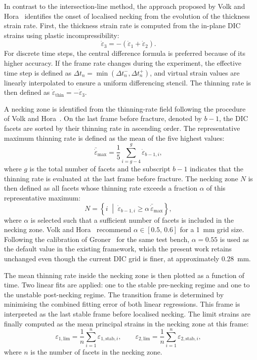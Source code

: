 In contrast to the intersection-line method, the approach proposed by
Volk and Hora~\cite{VolkHora2011} identifies the onset of localised necking
from the evolution of the thickness strain rate. First, the thickness strain
rate is computed from the in-plane DIC strains
using plastic incompressibility:
\begin{equation}
\dot{\varepsilon}_3 =
-\left(\dot{\varepsilon}_1 + \dot{\varepsilon}_2\right).
\end{equation}
For discrete time steps, the central difference formula is preferred because
of its higher accuracy. If the frame rate changes during the experiment, the
effective time step is defined as
$\Delta t_n = \min(\Delta t_n^{-}, \Delta t_n^{+})$, and virtual strain values
are linearly interpolated to ensure a uniform differencing stencil. The
thinning rate is then defined as
$\dot{\varepsilon}_{\text{thin}} = -\dot{\varepsilon}_3$.

A necking zone is identified from the thinning-rate field following the
procedure of Volk and Hora~\cite{VolkHora2011}. On the last frame before
fracture, denoted by $b-1$, the DIC facets are sorted by their thinning rate in
ascending order. The representative maximum thinning rate is defined as the
mean of the five highest values:
\begin{equation}
\bar{\dot{\varepsilon}}_{\max}
= \frac{1}{5}\sum_{i=g-4}^{g} \dot{\varepsilon}_{b-1,i},
\end{equation}
where $g$ is the total number of facets and the subscript $b-1$ indicates that
the thinning rate is evaluated at the last frame before fracture. The necking
zone $N$ is then defined as all facets whose thinning rate exceeds a fraction
$\alpha$ of this representative maximum:
\begin{equation}
N =
\left\{
i \;\middle|\;
\dot{\varepsilon}_{b-1,i}
\geq \alpha \, \bar{\dot{\varepsilon}}_{\max}
\right\},
\end{equation}
where $\alpha$ is selected such that a sufficient number of facets is included
in the necking zone. Volk and Hora~\cite{VolkHora2011} recommend
$\alpha \in [0.5,\,0.6]$ for a \SI{1}{\milli\meter} grid size. Following the
calibration of Groner~\cite{Groner2021} for the same test bench, $\alpha=0.55$
is used as the default value in the existing framework, which the present work
retains unchanged even though the current DIC grid is finer, at
approximately \SI{0.28}{\milli\meter}.

The mean thinning rate inside the necking zone is then plotted as a function of
time. Two linear fits are applied: one to the stable pre-necking regime and one
to the unstable post-necking regime. The transition frame is determined by
minimising the combined fitting error of both linear regressions. This frame is
interpreted as the last stable frame before localised necking. The limit strains
are finally computed as the mean principal strains in the necking zone at this
frame:
\begin{equation}
\varepsilon_{1,\text{lim}}
= \frac{1}{n}\sum_{i=1}^{n} \varepsilon_{1,\text{stab},i},
\qquad
\varepsilon_{2,\text{lim}}
= \frac{1}{n}\sum_{i=1}^{n} \varepsilon_{2,\text{stab},i},
\end{equation}
where $n$ is the number of facets in the necking zone.

